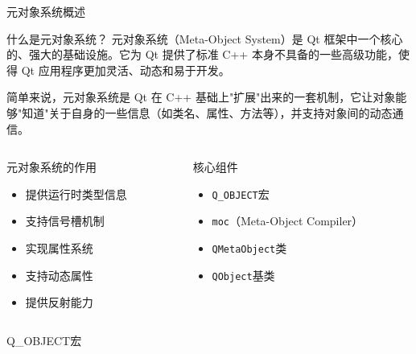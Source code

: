 \documentclass[UTF8,aspectratio=169]{beamer}
\begin{document}
\begin{frame}{元对象系统概述}
    \begin{ytublock}{什么是元对象系统？}
        元对象系统（Meta-Object System）是 Qt 框架中一个核心的、强大的基础设施。它为 Qt 提供了标准 C++ 本身不具备的一些高级功能，使得 Qt 应用程序更加灵活、动态和易于开发。

        简单来说，元对象系统是 Qt 在 C++ 基础上"扩展"出来的一套机制，它让对象能够"知道"关于自身的一些信息（如类名、属性、方法等），并支持对象间的动态通信。
    \end{ytublock}

    \begin{columns}
        \begin{column}{0.48\textwidth}
            \begin{ytublock}{元对象系统的作用}
                \begin{itemize}
                    \item 提供运行时类型信息
                    \item 支持信号槽机制
                    \item 实现属性系统
                    \item 支持动态属性
                    \item 提供反射能力
                \end{itemize}
            \end{ytublock}
        \end{column}
        \begin{column}{0.48\textwidth}
            \begin{ytublock}{核心组件}
                \begin{itemize}
                    \item \texttt{Q\_OBJECT}宏
                    \item \texttt{moc}（Meta-Object Compiler）
                    \item \texttt{QMetaObject}类
                    \item \texttt{QObject}基类
                \end{itemize}
            \end{ytublock}
        \end{column}
    \end{columns}
\end{frame}

\begin{frame}[fragile]{Q\_OBJECT宏}
  \begin{columns}
    \begin{column}{0.48\textwidth}
      \inputminted[firstline=1,lastline=20]{cpp}{code/qobject_example.h}
    \end{column}
    \begin{column}{0.48\textwidth}
      \inputminted[firstline=20,lastline=40]{cpp}{code/qobject_example.h}
    \end{column}
  \end{columns}
\end{frame}
\end{document}
